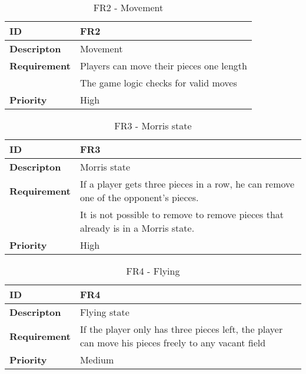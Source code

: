 \begin{table}[h!]
\begin{tabular}{ | p{90pt} | p{270pt}  |}
\hline
\bf ID &  FR2  \\ \hline
\bf Descripton & Movement \\ \hline 
\bf Requirement & Players can move their pieces one length  \\
& The game logic checks for valid moves  \\ \hline
\bf Priority & High \\ \hline

\end{tabular}

\caption{FR2 - Movement}

\end{table}


\begin{table}[h!]
\begin{tabular}{ | p{90pt} | p{270pt}  |}
\hline
\bf ID &  FR3  \\ \hline
\bf Descripton & Morris state \\ \hline 
\bf Requirement & If a player gets three pieces in a row, he can remove one of the opponent's pieces.  \\
& It is not possible to remove to remove pieces that already is in a Morris state. \\ \hline
\bf Priority & High \\ \hline

\end{tabular}

\caption{FR3 - Morris state}

\end{table}


\begin{table}[h!]
\begin{tabular}{ | p{90pt} | p{270pt}  |}
\hline
\bf ID &  FR4  \\ \hline
\bf Descripton & Flying state \\ \hline 
\bf Requirement & If the player only has three pieces left, the player can move his pieces freely to any vacant field \\ \hline
\bf Priority & Medium \\ \hline

\end{tabular}

\caption{FR4 - Flying}

\end{table}

